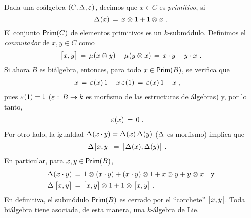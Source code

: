 \begin{obsElementosPrimitivos}\label{obs:elementosprimitivos}
	Dada una co\'{a}lgebra $(C,\Delta_{},\varepsilon_{})$, decimos que
	$x\in C$ es \emph{primitivo}, si
	\begin{equation}
		\label{eq:elementosprimitivos}
		\Delta_{}(x) \,=\,x\otimes_{} 1+1\otimes_{} x
		\text{ .}
	\end{equation}
	El conjunto $\mathsf{Prim}(C)$ de elementos primitivos es un $k$-subm\'{o}dulo.
	Definimos el \emph{conmutador} de $x,y\in C$ como
	\begin{equation}
		\label{eq:conmutador}
		\big[x,y\big] \,=\,\mu_{}(x\otimes_{} y)-
			\mu_{}(y\otimes_{} x) \,=\,x\cdot y-y\cdot x
		\text{ .}
	\end{equation}
	Si ahora $B$ es bi\'{a}lgebra, entonces, para todo $x\in\mathsf{Prim}(B)$, se
	verifica que
	\begin{align*}
		x & \,=\,\varepsilon_{}(x)\,1+x\,\varepsilon_{}(1) \,=\,
			\varepsilon_{}(x)\,1+x
		\text{ ,}
	\end{align*}
	pues $\varepsilon_{}(1)=1$ ($\varepsilon_{}:\,B\rightarrow k$ es morfismo de las
	estructuras de \'{a}lgebras) y, por lo tanto,
	\begin{align*}
		\varepsilon_{}(x) & \,=\,0
		\text{ .}
	\end{align*}
	Por otro lado, la igualdad
	$\Delta_{}(x\cdot y)=\Delta_{}(x)\,\Delta_{}(y)$ ($\Delta_{}$
	es morfismo) implica que
	\begin{align*}
		\Delta_{}\big[x,y\big] & \,=\,
			\big[\Delta_{}(x),\Delta_{}(y)\big]
		\text{ .}
	\end{align*}
	En particular, para $x,y\in\mathsf{Prim}(B)$,
	\begin{align*}
		\Delta_{}(x\cdot y) & \,=\,1\otimes_{}(x\cdot y)+
			(x\cdot y)\otimes_{} 1 + x\otimes_{} y + y\otimes_{} x
			\quad\text{y} \\
		\Delta_{}\,\big[x,y\big] & \,=\,
			\big[x,y\big]\otimes_{} 1+1\otimes_{}\big[x,y\big]
		\text{ .}
	\end{align*}
	En definitiva, el subm\'{o}dulo $\mathsf{Prim}(B)$ es cerrado por el
	``corchete'' $\big[x,y\big]$. Toda bi\'{a}lgebra tiene asociada, de
	esta manera, una $k$-\'{a}lgebra de Lie.
\end{obsElementosPrimitivos}

